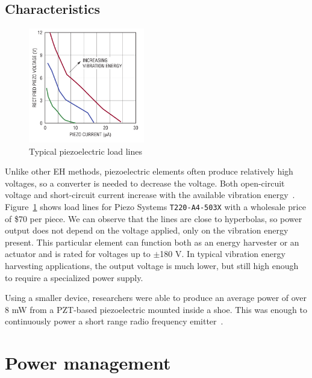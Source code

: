 \documentclass[a4paper,10pt]{article}
\begin{document}
\subsection{Characteristics}

\begin{figure}[h!]
\centering
  \includegraphics[width=0.45\textwidth]{./Slike/Piezo-UI}
\caption{Typical piezoelectric load lines~\cite{LT-Piezo}}
\label{fig:piezo-load}
\end{figure}

Unlike other \ac{EH} methods, piezoelectric elements often produce relatively high voltages, so a converter is needed to decrease the voltage. Both open-circuit voltage and short-circuit current increase with the available vibration energy~\cite{LT-Piezo}. Figure~\ref{fig:piezo-load} shows load lines for Piezo Systems \texttt{T220-A4-503X} with a wholesale price of \$70 per piece. We can observe that the lines are close to hyperbolas, so power output does not depend on the voltage applied, only on the vibration energy present. This particular element can function both as an energy harvester or an actuator and is rated for voltages up to $\pm$180 V. In typical vibration energy harvesting applications, the output voltage is much lower, but still high enough to require a specialized power supply. 

Using a smaller device, researchers were able to produce an average power of over 8 mW from a \ac{PZT}-based piezoelectric mounted inside a shoe. This was enough to continuously power a short range radio frequency emitter~\cite{piezo-shoe-ieee}. 


\section{Power management}
\end{document}
